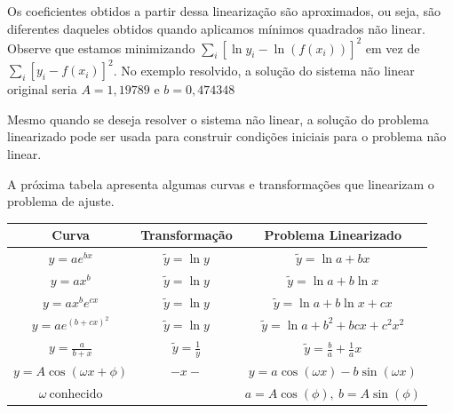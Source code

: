 \begin{obs}
Os coeficientes obtidos a partir dessa linearização são aproximados, ou seja, são diferentes daqueles obtidos quando aplicamos mínimos quadrados não linear. Observe que estamos minimizando $\displaystyle\sum_i [\ln y_i -\ln (f(x_i))]^2$ em vez de $\displaystyle\sum_i [ y_i -f(x_i)]^2$. No exemplo resolvido, a solução do sistema não linear original seria $A=1,19789$ e $b=0,474348$
\end{obs}

\begin{obs}
Mesmo quando se deseja resolver o sistema não linear, a solução do problema linearizado pode ser usada para construir condições iniciais para o problema não linear.
\end{obs}


A próxima tabela apresenta algumas curvas e transformações que linearizam o problema de ajuste.
\begin{center}
  \begin{tabular}{|c|c|c|}\hline
Curva    & Transformação & Problema Linearizado\\ \hline
$\displaystyle y=ae^{bx}$       & $\tilde y=\ln y$   & $\tilde y=\ln a+ bx$\\
$\displaystyle y=ax^b $       &$\tilde y=\ln y$   & $\tilde y=\ln a+ b\ln x$\\
$\displaystyle y=ax^be^{cx}$    &$\tilde y=\ln y$  & $\tilde y=\ln a+ b\ln x+cx$\\
$\displaystyle y=ae^{(b+cx)^2}$ &$\tilde y=\ln y$       & $\tilde y=\ln a+b^2+ bc x+c^2x^2$\\
$\displaystyle y=\frac{a}{b+x}$ &$\displaystyle \tilde y=\frac{1}{y}$ & $\displaystyle \tilde y=\frac{b}{a}+\frac{1}{a}x$\\
$y=A\cos(\omega x+\phi)$   & $-x-$ &  $y=a\cos(\omega x)-b\sin(\omega x)$ \\
$\omega\ \text{conhecido} $&   &  $a=A\cos(\phi),\ b=A\sin(\phi)$ \\ \hline
  \end{tabular}
\end{center}

